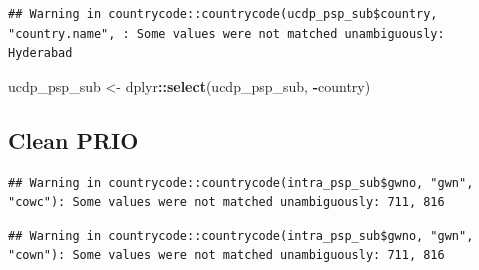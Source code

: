 \documentclass[
]{article}
\newenvironment{Shaded}{\begin{snugshade}}{\end{snugshade}}
\newcommand{\KeywordTok}[1]{\textcolor[rgb]{0.13,0.29,0.53}{\textbf{#1}}}
\newcommand{\NormalTok}[1]{#1}
\newcommand{\OperatorTok}[1]{\textcolor[rgb]{0.81,0.36,0.00}{\textbf{#1}}}
\newcommand{\StringTok}[1]{\textcolor[rgb]{0.31,0.60,0.02}{#1}}
\begin{document}
\begin{verbatim}
## Warning in countrycode::countrycode(ucdp_psp_sub$country, "country.name", : Some values were not matched unambiguously: Hyderabad
\end{verbatim}

\begin{Shaded}
\begin{Highlighting}[]
\NormalTok{ucdp_psp_sub <-}\StringTok{ }\NormalTok{dplyr}\OperatorTok{::}\KeywordTok{select}\NormalTok{(ucdp_psp_sub, }\OperatorTok{-}\NormalTok{country) }
\end{Highlighting}
\end{Shaded}

\hypertarget{clean-prio}{%
\subsection{Clean PRIO}\label{clean-prio}}

\begin{Shaded}
\end{Shaded}

\begin{verbatim}
## Warning in countrycode::countrycode(intra_psp_sub$gwno, "gwn", "cowc"): Some values were not matched unambiguously: 711, 816
\end{verbatim}

\begin{Shaded}
\end{Shaded}

\begin{verbatim}
## Warning in countrycode::countrycode(intra_psp_sub$gwno, "gwn", "cown"): Some values were not matched unambiguously: 711, 816
\end{verbatim}
\end{document}
